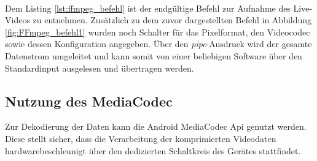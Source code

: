 ~\\
Dem Listing \ref{lst:ffmpeg_befehl} ist der endgültige Befehl zur Aufnahme des Live-Videos zu entnehmen. Zusätzlich zu dem zuvor dargestellten Befehl in Abbildung \ref{fig:FFmpeg_befehl1} wurden noch Schalter für das Pixelformat, den Videocodec sowie dessen Konfiguration angegeben. Über den \textit{pipe}-Ausdruck wird der gesamte Datenstrom umgeleitet und kann somit von einer beliebigen Software über den Standardinput ausgelesen und übertragen werden.

\subsection{Nutzung des MediaCodec}
Zur Dekodierung der Daten kann die Android MediaCodec Api genutzt werden. Diese stellt sicher, dass die Verarbeitung der komprimierten Videodaten hardwarebeschleunigt über den dedizierten Schaltkreis des Gerätes stattfindet. \\

